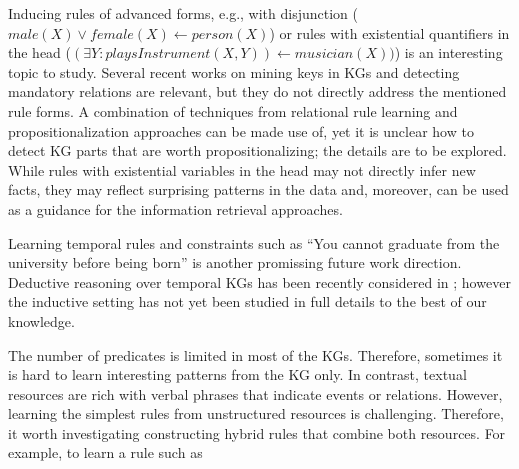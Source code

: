 Inducing rules of  advanced forms, e.g., %
with disjunction (\eg $male(X) \vee female(X) \leftarrow person(X)$) or rules with existential quantifiers in the head (\eg $(\exists Y: playsInstrument(X, Y)) \leftarrow musician(X))$) is an interesting topic to study. Several recent works on mining keys in KGs \cite{vickey,DBLP:conf/www/LajusS18} and detecting mandatory relations are relevant, but they do not directly address the mentioned rule forms. A combination of techniques from relational rule learning and propositionalization approaches \cite{} can be made use of, yet it is unclear how to detect KG parts that are worth propositionalizing; the details are to be explored. %
While rules with existential variables in the head may not directly infer new facts, they may reflect surprising patterns in the data and, moreover,  can be used as a guidance for the information retrieval approaches.


Learning temporal rules and constraints such as ``You cannot graduate from the university before being born'' is another promissing future work direction. Deductive reasoning over temporal KGs has been recently considered in \cite{DBLP:conf/aaai/ChekolPSS17}; however the inductive setting has not yet been studied in full details to the best of our knowledge.

 The number of predicates is limited in most of the KGs. Therefore, sometimes it is hard to learn interesting patterns from the KG only. In contrast, textual resources are rich with verbal phrases that indicate events or relations. However, learning the simplest rules from unstructured resources is challenging. Therefore, it worth investigating constructing hybrid rules that combine both resources.  For example, to learn a rule such as

